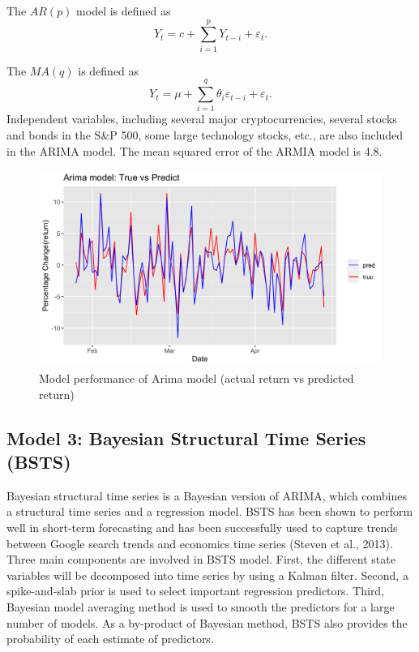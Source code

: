 \documentclass{article}
\begin{document}
\noindent The $AR(p)$ model is defined as $$Y_t=c+\sum_{i=1}^{p}Y_{t-i}+\varepsilon_t.$$

\noindent The $MA(q)$ is defined as $$Y_t=\mu+\sum_{i=1}^{q}\theta_i\varepsilon_{t-i}+\varepsilon_t.$$
Independent variables, including several major cryptocurrencies, several stocks and bonds in the S\&P 500, some large technology stocks, etc., are also included in the ARIMA model. The mean squared error of the ARMIA model is 4.8.\\

\begin{figure}[H]
	\centering
	\includegraphics[width=16cm]{../figures/arima_true_and_predict.png}
	\caption{Model performance of Arima model (actual return vs predicted return)}
	\label{fig: arima_true_and_predict}
\end{figure}

\subsection{Model 3: Bayesian Structural Time Series (BSTS)}

\noindent Bayesian structural time series is a Bayesian version of ARIMA, which combines a structural time series and a regression model. BSTS has been shown to perform well in short-term forecasting and has been successfully used to capture trends between Google search trends and economics time series (Steven et al., 2013). Three main components are involved in BSTS model. First, the different state variables will be decomposed into time series by using a Kalman filter. Second, a spike-and-slab prior is used to select important regression predictors. Third, Bayesian model averaging method is used to smooth the predictors for a large number of models. As a by-product of Bayesian method, BSTS also provides the probability of each estimate of predictors.\\
\end{document}
